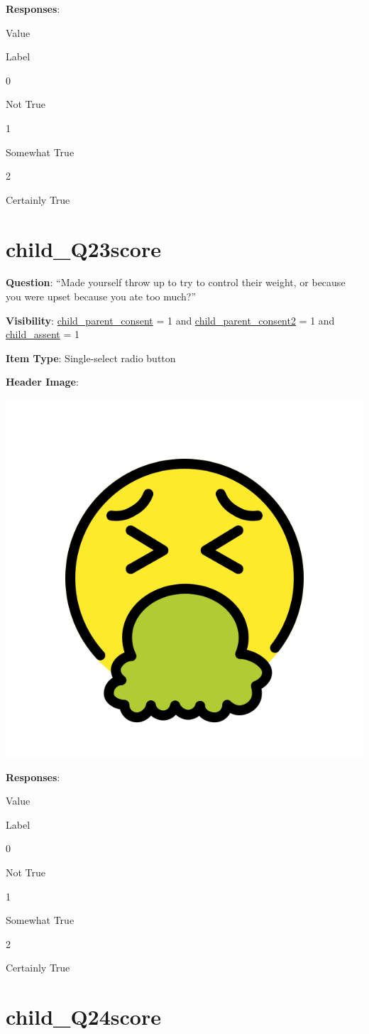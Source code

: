 \documentclass[]{book}
\begin{document}
\textbf{Responses}:

Value

Label

0

Not True

1

Somewhat True

2

Certainly True

\hypertarget{child_q23score}{%
\section{child\_Q23score}\label{child_q23score}}

\textbf{Question}: ``Made yourself throw up to try to control their weight, or because you were upset because you ate too much?''

\textbf{Visibility}: \protect\hyperlink{child_parent_consent}{child\_parent\_consent} = 1 and \protect\hyperlink{child_parent_consent2}{child\_parent\_consent2} = 1 and \protect\hyperlink{child_assent}{child\_assent} = 1

\textbf{Item Type}: Single-select radio button

\textbf{Header Image}:

\begin{flushleft}\includegraphics[width=0.33\linewidth]{downloadFigs4latex_HBN_PMHS_Codebook/child_Q23score_headerImg} \end{flushleft}

\textbf{Responses}:

Value

Label

0

Not True

1

Somewhat True

2

Certainly True

\hypertarget{child_q24score}{%
\section{child\_Q24score}\label{child_q24score}}
\end{document}
